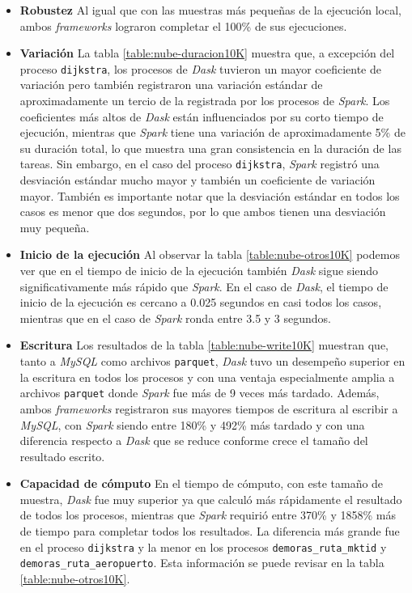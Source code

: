 \begin{itemize}
	
	\item \textbf{Robustez} Al igual que con las muestras más pequeñas de la ejecución local, ambos \textit{frameworks} lograron completar el 100\% de sus ejecuciones.
	
	\item \textbf{Variación} La tabla \ref{table:nube-duracion10K} muestra que, a excepción del proceso \texttt{dijkstra}, los procesos de \textit{Dask} tuvieron un mayor coeficiente de variación pero también registraron una variación estándar de aproximadamente un tercio de la registrada por los procesos de \textit{Spark}. Los coeficientes más altos de \textit{Dask} están influenciados por su corto tiempo de ejecución, mientras que \textit{Spark} tiene una variación de aproximadamente 5\% de su duración total, lo que muestra una gran consistencia en la duración de las tareas. Sin embargo, en el caso del proceso \texttt{dijkstra}, \textit{Spark} registró una desviación estándar mucho mayor y también un coeficiente de variación mayor.  También es importante notar que la desviación estándar en todos los casos es menor que dos segundos, por lo que ambos tienen una desviación muy pequeña. 
	
	\item \textbf{Inicio de la ejecución} Al observar la tabla \ref{table:nube-otros10K} podemos ver que en el tiempo de inicio de la ejecución también \textit{Dask} sigue siendo significativamente más rápido que \textit{Spark}. En el caso de \textit{Dask}, el tiempo de inicio de la ejecución es cercano a 0.025 segundos en casi todos los casos, mientras que en el caso de \textit{Spark} ronda entre 3.5 y 3 segundos.
	
	\item \textbf{Escritura} Los resultados de la tabla \ref{table:nube-write10K} muestran que, tanto a \textit{MySQL} como archivos \texttt{parquet}, \textit{Dask} tuvo un desempeño superior en la escritura en todos los procesos y con una ventaja especialmente amplia a archivos \texttt{parquet} donde \textit{Spark} fue más de 9 veces más tardado. Además, ambos \textit{frameworks} registraron sus mayores tiempos de escritura al escribir a \textit{MySQL}, con \textit{Spark} siendo entre 180\% y 492\% más tardado y con una diferencia respecto a \textit{Dask} que se reduce conforme crece el tamaño del resultado escrito. 
	
	\item \textbf{Capacidad de cómputo} En el tiempo de cómputo, con este tamaño de muestra, \textit{Dask} fue muy superior ya que calculó más rápidamente el resultado de todos los procesos, mientras que \textit{Spark} requirió entre 370\% y 1858\% más de tiempo para completar todos los resultados. La diferencia más grande fue en el proceso \texttt{dijkstra} y la menor en los procesos \texttt{demoras\_ruta\_mktid} y \texttt{demoras\_ruta\_aeropuerto}. Esta información se puede revisar en la tabla \ref{table:nube-otros10K}.


\end{itemize}
